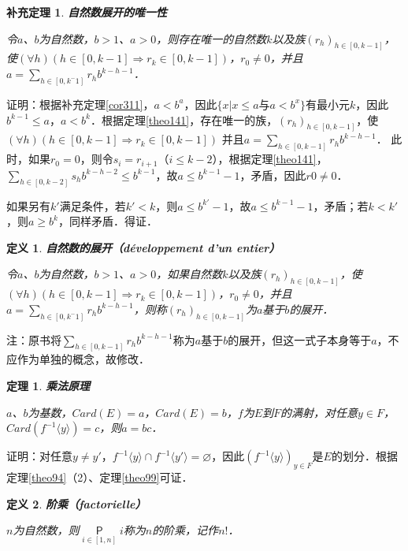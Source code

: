 \documentclass[12pt, a4paper, oneside]{book}
\newtheorem{theo}{定理}
\newtheorem{cor}{补充定理}
\newtheorem{de}{定义}
\begin{document}
			\begin{cor}\label{cor320}
				\textbf{自然数展开的唯一性}
				\par
				令$a$、$b$为自然数，$b>1$、$a>0$，则存在唯一的自然数$k$以及族$(r_h)_{h\in [0, k-1]}$，使$(\forall h)(h\in [0, k-1]\Rightarrow r_k\in [0, k-1])$，$r_0\neq 0$，并且$a=\sum\limits_{h\in [0, k^-1]}r_hb^{k-h-1}$．
			\end{cor}
			证明：根据补充定理\ref{cor311}，$a<b^a$，因此$\{x|x\leq a\text{与}a<b^x\}$有最小元$k$，因此$b^{k-1}\leq a$，$a<b^k$．根据定理\ref{theo141}，存在唯一的族，$(r_h)_{h\in [0, k-1]}$，使$(\forall h)(h\in [0, k-1]\Rightarrow r_k\in [0, k-1])$ 并且$a=\sum\limits_{h\in [0, k-1]}r_hb^{k-h-1}$．
			此时，如果$r_0=0$，则令$s_i=r_{i+1}$（$i\leq k-2$），根据定理\ref{theo141}，$\sum\limits_{h\in [0, k-2]}s_hb^{k-h-2}\leq b^{k-1}$，故$a\leq b^{k-1}-1$，矛盾，因此$r0\neq 0$．
			\par
			如果另有$k'$满足条件，若$k'<k$，则$a\leq b^{k'}-1$，故$a\leq b^{k-1}-1$，矛盾；若$k<k'$，则$a\geq b^k$，同样矛盾．得证．
			
			\begin{de}
				\textbf{自然数的展开（développement d'un entier）}
				\par
				令$a$、$b$为自然数，$b>1$、$a>0$，如果自然数$k$以及族$(r_h)_{h\in [0, k-1]}$，使$(\forall h)(h\in [0, k-1]\Rightarrow r_k\in [0, k-1])$，$r_0\neq 0$，并且$a=\sum\limits_{h\in [0, k^-1]}r_hb^{k-h-1}$，则称$(r_h)_{h\in [0, k-1]}$为$a$基于$b$的展开．
			\end{de}
			注：原书将$\sum\limits_{h\in [0, k-1]}r_hb^{k-h-1}$称为$a$基于$b$的展开，但这一式子本身等于$a$，不应作为单独的概念，故修改．
			
			\begin{theo}\label{theo142}
				\textbf{乘法原理}
				\par
				$a$、$b$为基数，$Card(E)=a$，$Card(E)=b$，$f$为$E$到$F$的满射，对任意$y\in F$，\\$Card(f^{-1}\langle y\rangle)=c$，则$a=bc$．
			\end{theo}
			证明：对任意$y\neq y'$，$f^{-1}\langle y\rangle\cap f^{-1}\langle y'\rangle=\varnothing$，因此$(f^{-1}\langle y\rangle)_{y\in F}$是$E$的划分．根据定理\ref{theo94}（2）、定理\ref{theo99}可证．
			
			\begin{de}
				\textbf{阶乘（factorielle）}
				\par
				$n$为自然数，则$\mathop{\mathsf{P}}\limits_{i\in [1, n]}i$称为$n$的阶乘，记作$n!$．
			\end{de}
			
\end{document}
